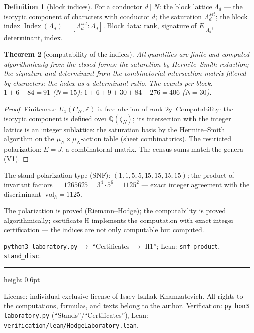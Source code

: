 \documentclass[11pt,a4paper]{article}
\theoremstyle{plain}
\newtheorem{theorem}{Theorem}
\theoremstyle{definition}
\newtheorem{definition}[theorem]{Definition}
\theoremstyle{remark}
\newcommand{\ZZ}{\mathbb{Z}}
\newcommand{\QQ}{\mathbb{Q}}
\newcommand{\Ind}{\operatorname{Index}}
\begin{document}
\begin{definition}[block indices]
For a conductor $d\mid N$: the block lattice $\Lambda_d$ --- the
isotypic component of characters with conductor $d$; the saturation
$\Lambda_d^{sat}$; the block index
$\Ind(\Lambda_d)=[\Lambda_d^{sat}:\Lambda_d]$. Block data: rank,
signature of $E|_{\Lambda_d}$, determinant, index.
\end{definition}

\begin{theorem}[computability of the indices]\label{th:indcomp}
All quantities are finite and computed algorithmically from the
closed forms: the saturation by Hermite--Smith reduction; the
signature and determinant from the combinatorial intersection
matrix filtered by characters; the index as a determinant ratio.
The counts per block: $1+6+84=91$ ($N=15$);
$1+6+9+30+84+276=406$ ($N=30$).
\end{theorem}

\begin{proof}
Finiteness: $H_1(C_N,\ZZ)$ is free abelian of rank $2g$.
Computability: the isotypic component is defined over
$\QQ(\zeta_N)$; its intersection with the integer lattice is an
integer sublattice; the saturation basis by the Hermite--Smith
algorithm on the $\mu_N\times\mu_N$-action table (sheet
combinatorics). The restricted polarization: $E=J$, a combinatorial
matrix. The census sums match the genera (V1).
\end{proof}

\begin{databox}
The stand polarization type (SNF): $(1,1,5,5,15,15,15,15)$; the
product of invariant factors $=1265625=3^4\cdot5^6=1125^2$ ---
exact integer agreement with the discriminant; $\mathrm{vol}_h=1125$.
\end{databox}

\begin{statusbox}[summary]
The polarization is proved (Riemann--Hodge); the computability is
proved algorithmically; certificate H implements the computation
with exact integer certification --- the indices are not only
computable but computed.
\end{statusbox}

\begin{verifybox}[reproduction]
\texttt{python3 laboratory.py} $\to$ ``Certificates $\to$ H1'';
Lean: \texttt{snf\_product}, \texttt{stand\_disc}.
\end{verifybox}

\vfill
{\color{linkblue}\hrule height 0.6pt}
\vspace{0.5em}
{\small\color{gray}
License: individual exclusive license of Isaev Iskhak Khamzatovich.
All rights to the computations, formulas, and texts belong to the author.
Verification: \texttt{python3 laboratory.py} (``Stands''/``Certificates''),
Lean: \texttt{verification/lean/HodgeLaboratory.lean}.
}
\end{document}
